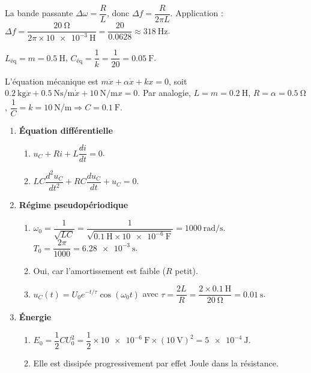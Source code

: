 La bande passante $\Delta \omega = \dfrac{R}{L}$, donc $\Delta f = \dfrac{R}{2\pi L}$. Application : $\Delta f = \dfrac{\SI{20}{\ohm}}{2\pi \times \SI{10e-3}{\henry}} = \dfrac{20}{0.0628} \approx \SI{318}{\hertz}$.

$L_{\text{éq}} = m = \SI{0.5}{\henry}$, $C_{\text{éq}} = \dfrac{1}{k} = \dfrac{1}{20} = \SI{0.05}{\farad}$.

L’équation mécanique est $m\ddot{x} + \alpha\dot{x} + kx = 0$, soit $\SI{0.2}{\kilogram} \ddot{x} + \SI{0.5}{\newton\second\per\metre} \dot{x} + \SI{10}{\newton\per\metre} x = 0$. Par analogie, $L = m = \SI{0.2}{\henry}$, $R = \alpha = \SI{0.5}{\ohm}$, $\dfrac{1}{C} = k = \SI{10}{\newton\per\metre} \Rightarrow C = \SI{0.1}{\farad}$.

\begin{enumerate}[label=\arabic*)]
  \item \textbf{Équation différentielle}
  \begin{enumerate}[label=\alph*)]
    \item $u_C + R i + L \dfrac{di}{dt} = 0$.
    \item $LC \dfrac{d^2u_C}{dt^2} + RC \dfrac{du_C}{dt} + u_C = 0$.
  \end{enumerate}
  \item \textbf{Régime pseudopériodique}
  \begin{enumerate}[label=\alph*)]
    \item $\omega_0 = \dfrac{1}{\sqrt{LC}} = \dfrac{1}{\sqrt{\SI{0.1}{\henry} \times \SI{10e-6}{\farad}}} = \SI{1000}{\radian\per\second}$. $T_0 = \dfrac{2\pi}{1000} = \SI{6.28e-3}{\second}$.
    \item Oui, car l’amortissement est faible ($R$ petit).
    \item $u_C(t) = U_0 e^{-t/\tau} \cos(\omega_0 t)$ avec $\tau = \dfrac{2L}{R} = \dfrac{2 \times \SI{0.1}{\henry}}{\SI{20}{\ohm}} = \SI{0.01}{\second}$.
  \end{enumerate}
  \item \textbf{Énergie}
  \begin{enumerate}[label=\alph*)]
    \item $E_0 = \dfrac{1}{2} C U_0^2 = \dfrac{1}{2} \times \SI{10e-6}{\farad} \times (\SI{10}{\volt})^2 = \SI{5e-4}{\joule}$.
    \item Elle est dissipée progressivement par effet Joule dans la résistance.
  \end{enumerate}
\end{enumerate}

